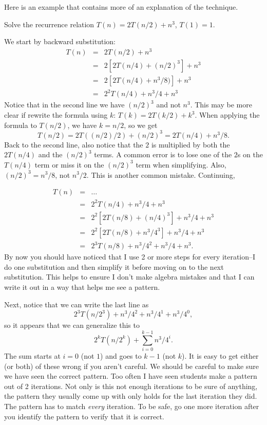 Here is an example that contains more of an explanation of the technique.
\begin{exa}\label{exa:longiterone}
Solve the recurrence relation $T(n)=2T(n/2)+ n^3$, $T(1)=1$.
\begin{sol}
We start by backward substitution:
\begin{eqnarray*}
T(n)&=&2T(n/2)+n^3\\
    &=&2[2T(n/4)+(n/2)^3]+n^3\\
    &=&2[2T(n/4)+n^3/8)]+n^3\\
    &=&2^2T(n/4)+n^3/4+n^3
\end{eqnarray*}
Notice that in the second line we have $(n/2)^3$ and not $n^3$.  
This may be more clear if rewrite the formula using $k$: $T(k)=2T(k/2)+k^3$.
When applying the formula to $T(n/2)$, we have $k=n/2$, so we get
$$T(n/2)=2T((n/2)/2)+(n/2)^3=2T(n/4)+n^3/8.$$
Back to the second line, 
also notice that the $2$ is multiplied by both the $2T(n/4)$ and the $(n/2)^3$ terms.
A common error is to lose one of the $2$s on the $T(n/4)$ term or miss it on
the $(n/2)^3$ term when simplifying.
Also, $(n/2)^3=n^3/8$, not $n^3/2$.  This is another common mistake.
Continuing,

\begin{eqnarray*}
T(n)&=&\ldots\\
    &=&2^2T(n/4)+n^3/4+n^3\\
    &=&2^2[2T(n/8)+(n/4)^3]+n^3/4+n^3\\
    &=&2^2[2T(n/8)+n^3/4^3]+n^3/4+n^3\\
    &=&2^3T(n/8)+n^3/4^2+n^3/4+n^3.
\end{eqnarray*}
By now you should have noticed that I use 2 or more steps for every iteration--I do one substitution
and then simplify it before moving on to the next substitution.  This helps to 
ensure I don't make algebra mistakes and that I can write it out in a way that 
helps me see a pattern.

Next, notice that we can write the last line as
$$2^3T(n/2^3)+n^3/4^2+n^3/4^1+n^3/4^0,$$
so it appears that we can generalize this to 
$$2^kT(n/2^k)+\sum_{i=0}^{k-1} n^3/4^i.$$
The sum starts at $i=0$ (not $1$) and goes to $k-1$ (not $k$).  
It is easy to get either (or both) of these wrong if you aren't careful.
We should be careful to make sure we have seen the correct pattern.
Too often I have seen students make a pattern out of 2 iterations.
Not only is this not enough iterations to be sure of anything, 
the pattern they usually come up with only holds for the last iteration they did. 
The pattern has to match {\em every} iteration.  
To be safe, go one more iteration after you
identify the pattern to verify that it is correct.


\end{sol}
\end{exa}
